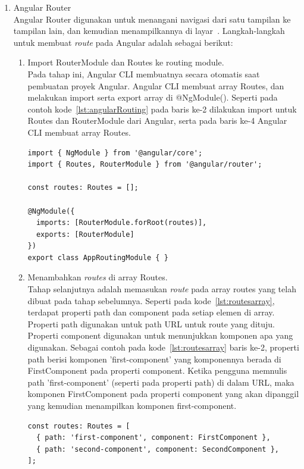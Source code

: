 \begin{enumerate}
	\item Angular Router \\
	Angular Router digunakan untuk menangani navigasi dari satu tampilan ke tampilan lain, dan kemudian menampilkannya di layar~\cite{victor:17:angular}. Langkah-langkah untuk membuat \textit{route} pada Angular adalah sebagai berikut:
	
	\begin{enumerate}
		\item Import RouterModule dan Routes ke routing module. \\
		Pada tahap ini, Angular CLI membuatnya secara otomatis saat pembuatan proyek Angular. Angular CLI membuat array Routes, dan melakukan import serta export array di @NgModule(). Seperti pada contoh kode~\ref{lst:angularRouting} pada baris ke-2 dilakukan import untuk Routes dan RouterModule dari Angular, serta pada baris ke-4 Angular CLI membuat array Routes.
		
\begin{lstlisting}[label={lst:angularRouting}, caption={Contoh \textit{Routing} pada Angular}]
import { NgModule } from '@angular/core';
import { Routes, RouterModule } from '@angular/router';

const routes: Routes = []; 

@NgModule({
  imports: [RouterModule.forRoot(routes)],
  exports: [RouterModule]
})
export class AppRoutingModule { }
\end{lstlisting}
		
		\item Menambahkan \textit{routes} di array Routes. \\
		Tahap selanjutnya adalah memasukan \textit{route} pada array routes yang telah dibuat pada tahap sebelumnya. Seperti pada kode~\ref{lst:routesarray}, terdapat properti path dan component pada setiap elemen di array. Properti path digunakan untuk path URL untuk route yang dituju. Properti component digunakan untuk menunjukkan komponen apa yang digunakan. Sebagai contoh pada kode~\ref{lst:routesarray} baris ke-2, properti path berisi komponen 'first-component' yang komponennya berada di FirstComponent pada properti component. Ketika pengguna memnulis path 'first-component' (seperti pada properti path) di dalam URL, maka komponen FirstComponent pada properti component yang akan dipanggil yang kemudian menampilkan komponen first-component.
		
\begin{lstlisting}[label={lst:routesarray}, caption={Contoh \textit{Routing} pada Angular}]
const routes: Routes = [
  { path: 'first-component', component: FirstComponent },
  { path: 'second-component', component: SecondComponent },
];
\end{lstlisting}
	

\end{enumerate}
\end{enumerate}
